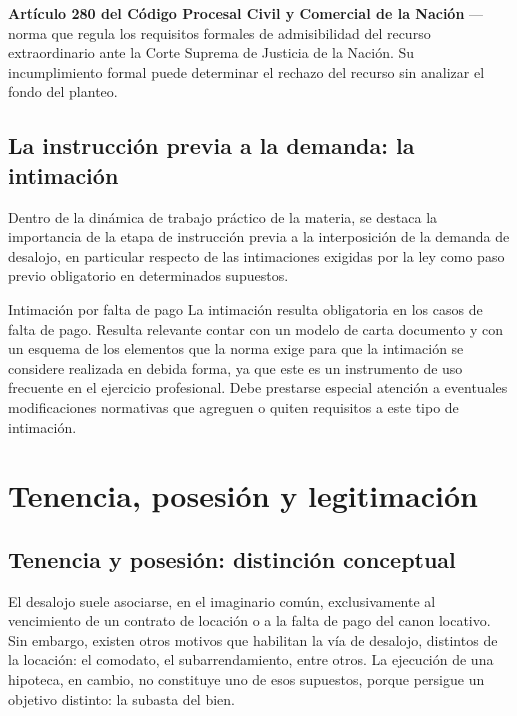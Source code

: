 \documentclass[12pt,oneside]{book}
\begin{document}
\begin{normacitada}
\textbf{Artículo 280 del Código Procesal Civil y Comercial de la Nación} --- norma que regula los requisitos formales de admisibilidad del recurso extraordinario ante la Corte Suprema de Justicia de la Nación. Su incumplimiento formal puede determinar el rechazo del recurso sin analizar el fondo del planteo.
\end{normacitada}

\section{La instrucción previa a la demanda: la intimación}

Dentro de la dinámica de trabajo práctico de la materia, se destaca la importancia de la etapa de instrucción previa a la interposición de la demanda de desalojo, en particular respecto de las intimaciones exigidas por la ley como paso previo obligatorio en determinados supuestos.

\begin{example}{Intimación por falta de pago}
La intimación resulta obligatoria en los casos de falta de pago. Resulta relevante contar con un modelo de carta documento y con un esquema de los elementos que la norma exige para que la intimación se considere realizada en debida forma, ya que este es un instrumento de uso frecuente en el ejercicio profesional. Debe prestarse especial atención a eventuales modificaciones normativas que agreguen o quiten requisitos a este tipo de intimación.
\end{example}


\chapter{Tenencia, posesión y legitimación}
\label{cap:tenencia}

\section{Tenencia y posesión: distinción conceptual}

El desalojo suele asociarse, en el imaginario común, exclusivamente al vencimiento de un contrato de locación o a la falta de pago del canon locativo. Sin embargo, existen otros motivos que habilitan la vía de desalojo, distintos de la locación: el comodato, el subarrendamiento, entre otros. La ejecución de una hipoteca, en cambio, no constituye uno de esos supuestos, porque persigue un objetivo distinto: la subasta del bien.
\end{document}
